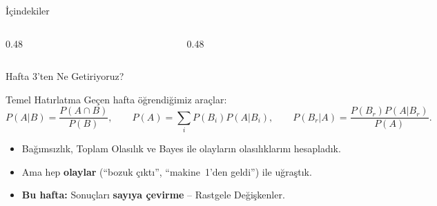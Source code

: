 ﻿\documentclass[light]{lutbeamer}
\begin{document}
\begin{frame}{İçindekiler}
  \scriptsize
  \begin{columns}[T]
    \begin{column}{0.48\textwidth}
      \tableofcontents[sections={1-3}]
    \end{column}
    \begin{column}{0.48\textwidth}
      \tableofcontents[sections={4-10}]
    \end{column}
  \end{columns}
\end{frame}




\begin{frame}{Hafta 3'ten Ne Getiriyoruz?}
    \begin{block}{Temel Hatırlatma}
        Geçen hafta öğrendiğimiz araçlar:
        \[
        P(A|B)=\frac{P(A\cap B)}{P(B)}, \qquad
        P(A)=\sum_{i}P(B_i)P(A|B_i), \qquad
        P(B_r|A)=\frac{P(B_r)P(A|B_r)}{P(A)}.
        \]
    \end{block}

    \begin{itemize}
        \item Bağımsızlık, Toplam Olasılık ve Bayes ile olayların olasılıklarını hesapladık.
        \item Ama hep \textbf{olaylar} (``bozuk çıktı'', ``makine~1'den geldi'') ile uğraştık.
        \item \textbf{Bu hafta:} Sonuçları \textbf{sayıya çevirme} -- Rastgele Değişkenler.
    \end{itemize}
\end{frame}
\end{document}

